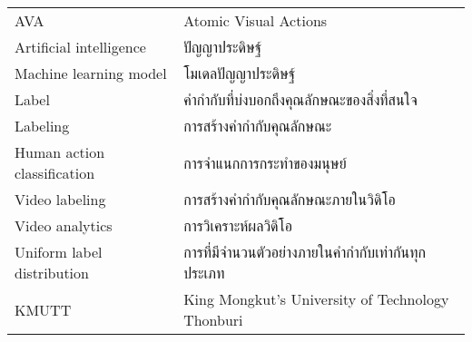 \begin{abbreviations}
    \noindent
    \begin{tabular*}{\textwidth}{@{}p{}p{}@{}}
        {AVA} & {Atomic Visual Actions} \\
        {Artificial intelligence} & {ปัญญาประดิษฐ์} \\
        {Machine learning model} & {โมเดลปัญญาประดิษฐ์} \\
        {Label} & {คำกำกับที่บ่งบอกถึงคุณลักษณะของสิ่งที่สนใจ} \\
        {Labeling} & {การสร้างคำกำกับคุณลักษณะ} \\
        {Human action classification} & {การจำแนกการกระทำของมนุษย์} \\
        {Video labeling} & {การสร้างคำกำกับคุณลักษณะภายในวิดิโอ} \\
        {Video analytics} & {การวิเคราะห์ผลวิดิโอ} \\
        {Uniform label distribution} & {การที่มีจำนวนตัวอย่างภายในคำกำกับเท่ากันทุกประเภท} \\
        {KMUTT} & {King Mongkut's University of Technology Thonburi} \\
    \end{tabular*}
\end{abbreviations}
